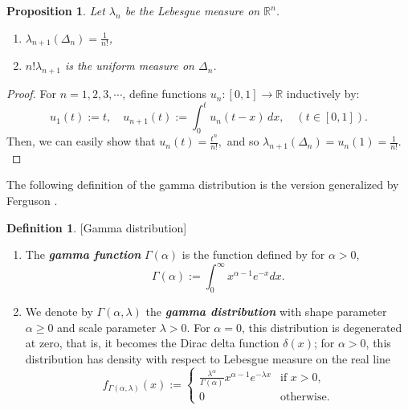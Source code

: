\documentclass[12pt, a4paper]{amsart}
\theoremstyle{plain}
\newtheorem{prop}[thm]{Proposition}
\theoremstyle{definition}
\newtheorem{defn}[thm]{Definition}
\numberwithin{figure}{section}
\numberwithin{table}{section}
\newcommand{\newword}[1]{\textbf{\textit{#1}}}
\numberwithin{equation}{section}
\begin{document}
\begin{prop}%
\label{prop:DeltaNvol}
Let
$\lambda_n$
be the Lebesgue measure on 
$\mathbb{R}^n$.
\begin{enumerate}
\item
$
\lambda_{n+1}(\Delta_n)
	=
\frac{1}{n!}
$,

\item
$
n! \lambda_{n+1}
$
is the uniform measure on 
$
\Delta_n
$.
\end{enumerate}
\end{prop}
\begin{proof}
For $n = 1, 2, 3, \cdots$, 
define functions
$
u_n : [0,1] \to \mathbb{R}
$
inductively by:
\[
u_1(t) := t,
		\quad
u_{n+1}(t)
	:=
\int_0^t
	u_n(t-x) 
	\,
d x ,
		\quad
	(t \in [0,1]).
\]
Then, we can easily show that
$
u_n(t) = \frac{t^n}{n!} ,
$
and so
$
\lambda_{n+1}(\Delta_n) =
u_n(1) = \frac{1}{n!}.
$

\end{proof}



The following definition of the gamma distribution is the version generalized by Ferguson
\cite{ferguson_1973}.

\begin{defn}{[Gamma distribution]}
\label{defn:gammaDist}
\begin{enumerate}
  \item
The \newword{gamma function}
$
\Gamma(\alpha)
$
is the function defined by for $\alpha > 0$,
\begin{equation}
\label{eq:GammaFunc}
\Gamma(\alpha)
	:=
\int_0^{\infty}
	x^{\alpha - 1}
	e^{-x} 
d x.
\end{equation}

\item
We denote by
$
\Gamma(\alpha, \lambda)
$
the \newword{gamma distribution} with shape parameter
$
\alpha \ge 0
$
and scale parameter
$
\lambda > 0
$.
For
$
\alpha = 0
$,
this distribution is degenerated at zero, that is, 
it becomes the Dirac delta function
$
\delta(x)
$;
for
$
\alpha > 0
$,
this distribution has density with respect to Lebesgue measure on the real line
\begin{equation}
\label{eq:gammaDist}
f_{
	\Gamma(\alpha, \lambda)
}
(x)
	:=
\begin{cases}
\frac{\lambda^{\alpha}}{\Gamma(\alpha)}
x^{\alpha - 1}
e^{- \lambda x}
		& \textrm{if }
x > 0,
		\\
0
		& \textrm{otherwise.}
\end{cases}
\end{equation}

\end{enumerate}
\end{defn}
\end{document}
